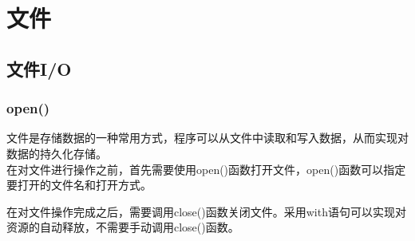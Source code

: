 \chapter{文件}

\section{文件I/O}

\subsection{open()}

文件是存储数据的一种常用方式，程序可以从文件中读取和写入数据，从而实现对数据的持久化存储。\\

在对文件进行操作之前，首先需要使用open()函数打开文件，open()函数可以指定要打开的文件名和打开方式。\\

\begin{table}[H]
    \centering
    \caption{文件打开方式}
\end{table}

在对文件操作完成之后，需要调用close()函数关闭文件。采用with语句可以实现对资源的自动释放，不需要手动调用close()函数。\\

